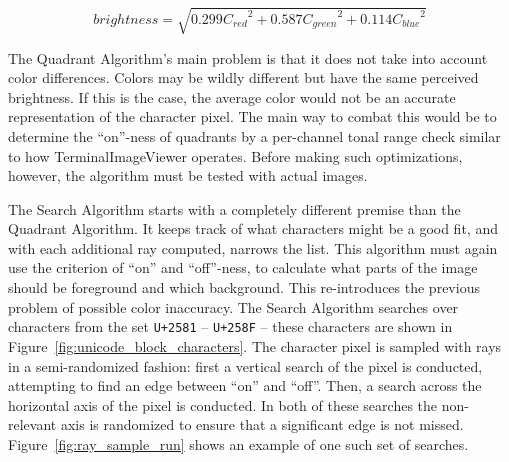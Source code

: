 \documentclass[11pt]{article}
\def\widow#1{\vskip #1\vbadness10000\penalty-200\vskip-#1}
\def\littlesection#1{
  \widow{2cm}
  \vskip 0.5cm
  \noindent{\bf #1}
  \vskip 0.0001cm
}
\begin{document}
\begin{equation}
  \label{equation:perceived_brightness}
  {brightness} = \sqrt{0.299 {C_{red}}^2 + 0.587 {C_{green}}^2 + 0.114 {C_{blue}}^2}
\end{equation}

The Quadrant Algorithm's main problem is that it does not take into account color differences.
Colors may be wildly different but have the same perceived brightness.
If this is the case, the average color would not be an accurate representation of the character pixel.
The main way to combat this would be to determine the ``on''-ness of quadrants by a per-channel tonal range check similar to how TerminalImageViewer operates.
Before making such optimizations, however, the algorithm must be tested with actual images.


\littlesection{Search Algorithm}

The Search Algorithm starts with a completely different premise than the Quadrant Algorithm.
It keeps track of what characters might be a good fit, and with each additional ray computed, narrows the list.
This algorithm must again use the criterion of ``on'' and ``off''-ness, to calculate what parts of the image should be foreground and which background.
This re-introduces the previous problem of possible color inaccuracy.
The Search Algorithm searches over characters from the set \texttt{U+2581} -- \texttt{U+258F} -- these characters are shown in Figure~\ref{fig:unicode_block_characters}.
The character pixel is sampled with rays in a semi-randomized fashion: first a vertical search of the pixel is conducted, attempting to find an edge between ``on'' and ``off''.
Then, a search across the horizontal axis of the pixel is conducted.
In both of these searches the non-relevant axis is randomized to ensure that a significant edge is not missed.
Figure~\ref{fig:ray_sample_run} shows an example of one such set of searches.
\end{document}

